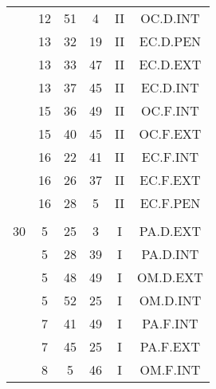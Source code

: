 \documentclass[12pt, a4paper]{article}
\begin{document}
\begin{multicols}{3}
{\begin{tabular}{c c c c c c}
	 	 	 	 & 12 & 51 & 4 & II & OC.D.INT\\%
	 	 	 	 & 13 & 32 & 19 & II & EC.D.PEN\\%
	 	 	 	 & 13 & 33 & 47 & II & EC.D.EXT\\%
	 	 	 	 & 13 & 37 & 45 & II & EC.D.INT\\%
	 	 	 	 & 15 & 36 & 49 & II & OC.F.INT\\%
	 	 	 	 & 15 & 40 & 45 & II & OC.F.EXT\\%
	 	 	 	 & 16 & 22 & 41 & II & EC.F.INT\\%
	 	 	 	 & 16 & 26 & 37 & II & EC.F.EXT\\%
	 	 	 	 & 16 & 28 & 5 & II & EC.F.PEN\\%
	 	 	 	 & & & & & \\%
	 	 	 	30 & 5 & 25 & 3 & I & PA.D.EXT\\%
	 	 	 	 & 5 & 28 & 39 & I & PA.D.INT\\%
	 	 	 	 & 5 & 48 & 49 & I & OM.D.EXT\\%
	 	 	 	 & 5 & 52 & 25 & I & OM.D.INT\\%
	 	 	 	 & 7 & 41 & 49 & I & PA.F.INT\\%
	 	 	 	 & 7 & 45 & 25 & I & PA.F.EXT\\%
	 	 	 	 & 8 & 5 & 46 & I & OM.F.INT\\%
	 	 \end{tabular}
 	}
\end{multicols}
\end{document}
